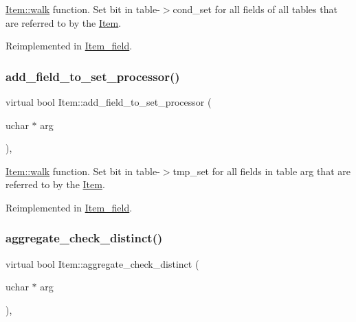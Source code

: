 \mbox{\hyperlink{classItem_ab7d2529511c14a77e59a1b1bbabc95d7}{Item\+::walk}} function. Set bit in table-\/$>$cond\+\_\+set for all fields of all tables that are referred to by the \mbox{\hyperlink{classItem}{Item}}. 

Reimplemented in \mbox{\hyperlink{classItem__field_a9296d0ae378518ab8aed6c1e9c7a3bf9}{Item\+\_\+field}}.

\mbox{\label{classItem_ad26ce6d5e983b547db3e32efa17a36df}} 
\subsubsection{\texorpdfstring{add\+\_\+field\+\_\+to\+\_\+set\+\_\+processor()}{add\_field\_to\_set\_processor()}}
{\footnotesize\ttfamily virtual bool Item\+::add\+\_\+field\+\_\+to\+\_\+set\+\_\+processor (\begin{DoxyParamCaption}\item[{uchar $\ast$}]{arg }\end{DoxyParamCaption})\hspace{0.3cm}{\ttfamily [inline]}, {\ttfamily [virtual]}}

\mbox{\hyperlink{classItem_ab7d2529511c14a77e59a1b1bbabc95d7}{Item\+::walk}} function. Set bit in table-\/$>$tmp\+\_\+set for all fields in table \textquotesingle{}arg\textquotesingle{} that are referred to by the \mbox{\hyperlink{classItem}{Item}}. 

Reimplemented in \mbox{\hyperlink{classItem__field_accdc70183bdbc1279be2ef8d3f0ab042}{Item\+\_\+field}}.

\mbox{\label{classItem_a7291ce9a64c0201c71463033b4346df4}} 
\subsubsection{\texorpdfstring{aggregate\+\_\+check\+\_\+distinct()}{aggregate\_check\_distinct()}}
{\footnotesize\ttfamily virtual bool Item\+::aggregate\+\_\+check\+\_\+distinct (\begin{DoxyParamCaption}\item[{uchar $\ast$}]{arg }\end{DoxyParamCaption})\hspace{0.3cm}{\ttfamily [inline]}, {\ttfamily [virtual]}}

